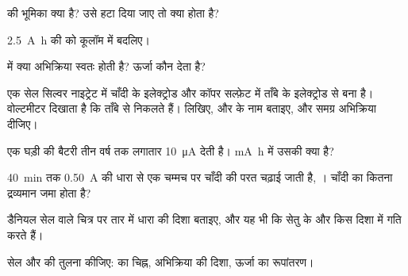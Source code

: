 \begin{exercise}[$\star$]\label{exo:g12:cells-and-electrolysis:3}
 की भूमिका क्या है? उसे हटा दिया जाए तो क्या होता है?
\end{exercise}

\begin{exercise}[$\star$]\label{exo:g12:cells-and-electrolysis:4}
\qty{2.5}{A.h} की  को कूलॉम में बदलिए।
\end{exercise}

\begin{exercise}[$\star$]\label{exo:g12:cells-and-electrolysis:5}
 में क्या अभिक्रिया स्वतः होती है? ऊर्जा
कौन देता है?
\end{exercise}

\begin{exercise}[$\star\star$]\label{exo:g12:cells-and-electrolysis:6}
एक सेल सिल्वर नाइट्रेट में चाँदी के इलेक्ट्रोड और कॉपर सल्फ़ेट में ताँबे के
इलेक्ट्रोड से बना है। वोल्टमीटर दिखाता है कि 
ताँबे से निकलते हैं।  लिखिए,  और  के नाम बताइए,
और समग्र अभिक्रिया दीजिए।
\end{exercise}

\begin{exercise}[$\star\star$]\label{exo:g12:cells-and-electrolysis:7}
एक घड़ी की बैटरी तीन वर्ष तक लगातार \qty{10}{\micro A} देती है।
\si{mA.h} में उसकी  क्या है?
\end{exercise}

\begin{exercise}[$\star\star$]\label{exo:g12:cells-and-electrolysis:8}
\qty{40}{min} तक \qty{0.50}{A} की धारा से एक चम्मच पर चाँदी की परत चढ़ाई जाती है,
। चाँदी का कितना द्रव्यमान जमा होता है?
\end{exercise}

\begin{exercise}[$\star\star$]\label{exo:g12:cells-and-electrolysis:9}
डैनियल सेल वाले चित्र पर तार में धारा की दिशा बताइए, और यह भी कि
सेतु के  और   किस दिशा में
गति करते हैं।
\end{exercise}

\begin{exercise}[$\star\star$]\label{exo:g12:cells-and-electrolysis:10}
सेल और  की तुलना कीजिए:  का चिह्न, अभिक्रिया की
दिशा, ऊर्जा का रूपांतरण।
\end{exercise}

